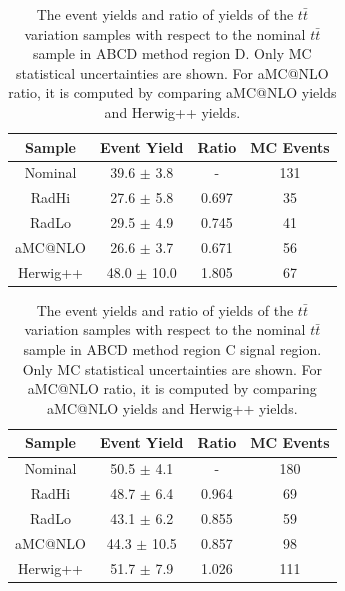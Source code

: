 \begin{table}[htbp!]
\begin{center}
\begin{tabular}{c|c|c||c}
Sample     & Event Yield       & Ratio  & MC Events \\ 
\hline
Nominal    & 39.6 $\pm$ 3.8   & -      &  131 \\
RadHi      & 27.6 $\pm$ 5.8   & 0.697  &  35  \\
RadLo      & 29.5 $\pm$ 4.9   & 0.745  &  41  \\
aMC@NLO    & 26.6 $\pm$ 3.7   & 0.671  &  56  \\
Herwig++   & 48.0 $\pm$ 10.0  & 1.805  &  67  \\
\end{tabular}
\end{center}
\caption{The event yields and ratio of yields of the $t\bar{t}$ variation samples
with respect to the nominal $t\bar{t}$ sample in ABCD method region D.
Only MC statistical uncertainties are shown. For aMC@NLO ratio, it is 
computed by comparing aMC@NLO yields and Herwig++ yields.} 
\label{tab:boosted_qcd_region_d_systematics_ttbar_yields}
\end{table}
%
%
\begin{table}[htbp!]
\begin{center}
\begin{tabular}{c|c|c||c}
Sample     & Event Yield       & Ratio  & MC Events \\ 
\hline
Nominal    & 50.5 $\pm$ 4.1     & -     & 180 \\
RadHi      & 48.7 $\pm$ 6.4     & 0.964 & 69   \\
RadLo      & 43.1 $\pm$ 6.2     & 0.855 & 59   \\
aMC@NLO    & 44.3 $\pm$ 10.5    & 0.857 & 98   \\
Herwig++   & 51.7 $\pm$ 7.9     & 1.026 & 111  \\
\end{tabular}
\end{center}
\caption{The event yields and ratio of yields of the $t\bar{t}$ variation samples
with respect to the nominal $t\bar{t}$ sample in ABCD method region C signal region.
Only MC statistical uncertainties are shown. For aMC@NLO ratio, it is computed by comparing 
aMC@NLO yields and Herwig++ yields.} 
\label{tab:boosted_qcd_region_c_SR_systematics_ttbar_yields}
\end{table}
%
